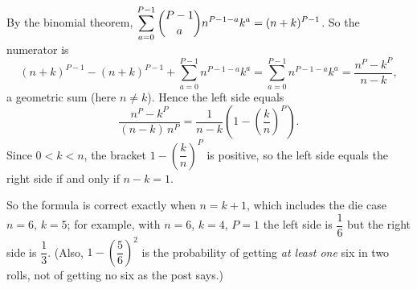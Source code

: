 By the binomial theorem, $\displaystyle\sum_{a=0}^{P-1}\dbinom{P-1}{a}n^{P-1-a}k^a=(n+k)^{P-1}$. So the numerator is
\[
(n+k)^{P-1}-(n+k)^{P-1}+\sum_{a=0}^{P-1}n^{P-1-a}k^{a}=\sum_{a=0}^{P-1}n^{P-1-a}k^{a}=\dfrac{n^P-k^P}{n-k},
\]
a geometric sum (here $n\ne k$). Hence the left side equals
\[
\dfrac{n^P-k^P}{(n-k)\,n^P}=\dfrac{1}{n-k}\left(1-\left(\dfrac{k}{n}\right)^{P}\right).
\]
Since $0<k<n$, the bracket $1-\left(\dfrac{k}{n}\right)^P$ is positive, so the left side equals the right side if and only if $n-k=1$.

So the formula is correct exactly when $\boxed{n=k+1}$, which includes the die case $n=6$, $k=5$; for example, with $n=6$, $k=4$, $P=1$ the left side is $\dfrac{1}{6}$ but the right side is $\dfrac{1}{3}$. (Also, $1-\left(\dfrac{5}{6}\right)^2$ is the probability of getting \emph{at least one} six in two rolls, not of getting no six as the post says.)

